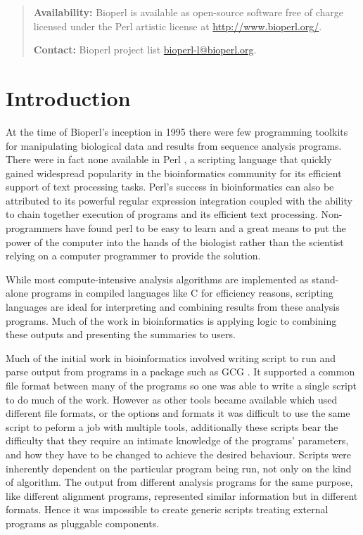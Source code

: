 \documentclass[twocolumn]{article}
\begin{document}
\begin{abstract}
\textbf{Availability:} Bioperl is available as open-source software free
of charge licensed under the Perl artistic license at \url{http://www.bioperl.org/}.

\textbf{Contact:} Bioperl project list \url{bioperl-l@bioperl.org}.

\end{abstract}

\section{Introduction}

At the time of Bioperl's inception in 1995 \cite{Fullen1995} there
were few programming toolkits for manipulating biological data and
results from sequence analysis programs.  There were in fact none
available in Perl \cite{Wall2000}, a scripting language that quickly
gained widespread popularity in the bioinformatics community for its
efficient support of text processing tasks.  Perl's success in
bioinformatics can also be attributed to its powerful regular
expression integration coupled with the ability to chain together
execution of programs and its efficient text processing.
Non-programmers have found perl to be easy to learn and a great means
to put the power of the computer into the hands of the biologist
rather than the scientist relying on a computer programmer to provide
the solution.

While most compute-intensive analysis algorithms are implemented as
stand-alone programs in compiled languages like C for efficiency
reasons, scripting languages are ideal for interpreting and combining
results from these analysis programs.  Much of the work in
bioinformatics is applying logic to combining these outputs and
presenting the summaries to users.  
 
Much of the initial work in bioinformatics involved writing script to
run and parse output from programs in a package such as GCG
\cite{Devereux1984}. It supported a common file format between many of
the programs so one was able to write a single script to do much of
the work.  However as other tools became available which used
different file formats, or the options and formats it was difficult to
use the same script to peform a job with multiple tools, additionally
these scripts bear the difficulty that they require an intimate
knowledge of the programs' parameters, and how they have to be changed
to achieve the desired behaviour.  Scripts were inherently dependent
on the particular program being run, not only on the kind of
algorithm.  The output from different analysis programs for the same
purpose, like different alignment programs, represented similar
information but in different formats.  Hence it was impossible to
create generic scripts treating external programs as pluggable
components.
\end{document}
